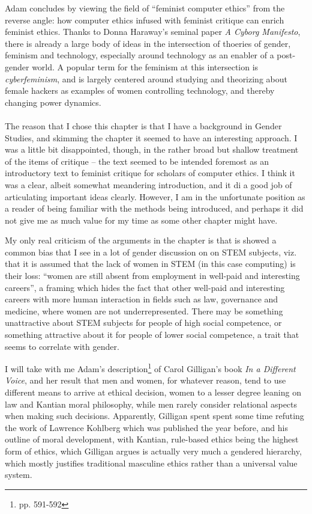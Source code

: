 \documentclass{article}
\begin{document}
Adam concludes by viewing the field of ``feminist computer ethics'' from the
reverse angle: how computer ethics infused with feminist critique can enrich
feminist ethics. Thanks to Donna Haraway's seminal paper \textit{A Cyborg
  Manifesto}, there is already a large body of ideas in the intersection of
thoeries of gender, feminism and technology, especially around technology as
an enabler of a post-gender world. A popular term for the feminism at this
intersection is \textit{cyberfeminism}, and is largely centered around studying
and theorizing about female hackers as examples of women controlling technology,
and thereby changing power dynamics.

\paragraph{}The reason that I chose this chapter is that I have a background in
Gender Studies, and skimming the chapter it seemed to have an interesting
approach. I was a little bit disappointed, though, in the rather broad but
shallow treatment of the items of critique -- the text seemed to be intended foremost as an
introductory text to feminist critique for scholars of computer ethics. I think
it was a clear, albeit somewhat meandering introduction, and it di a good job of
articulating important ideas clearly. However, I am in the unfortunate position
as a reader of being familiar with the methods being introduced, and perhaps it
did not give me as much value for my time as some other chapter might have.

My only real criticism of the arguments in the chapter is that is showed a
common bias that I see in a lot of gender discussion on
on STEM subjects, viz. that it is assumed that the lack of women in STEM (in
this case computing) is their loss: ``women are still absent from employment in
well-paid and interesting careers'', a framing which hides the fact that other
well-paid and interesting careers with more human interaction in fields such as law,
governance and medicine, where women are not underrepresented. There may be
something unattractive about STEM subjects for people of high social competence,
or something attractive about it for people of lower social competence, a trait
that seems to correlate with gender.

I will take with me Adam's description\footnote{pp. 591-592} of Carol Gilligan's book \textit{In a
  Different Voice}, and her result that men and women, for whatever reason, tend
to use different means to arrive at ethical decision, women to a lesser degree
leaning on law and Kantian moral philosophy, while men rarely consider
relational aspects when making such decisions. Apparently, Gilligan spent spent
some time refuting the work of Lawrence Kohlberg which was published the year
before, and his outline of moral development, with Kantian, rule-based ethics
being the highest form of ethics, which Gilligan argues is actually very much a
gendered hierarchy, which mostly justifies traditional masculine ethics rather
than a universal value system.
\end{document}
